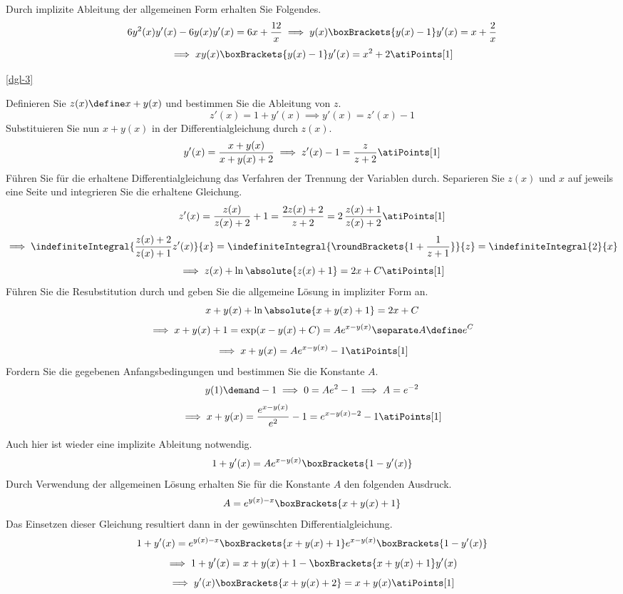 \begin{atiSolution}
\begin{atiSubtaskSolutions}
{			Durch implizite Ableitung der allgemeinen Form erhalten Sie Folgendes.
			\[
				6y^2(x)y'(x) - 6y(x)y'(x) = 6x + \frac{12}{x} \implies y(x)\boxBrackets{y(x)-1}y'(x) = x + \frac{2}{x}
			\]
			\[
				\implies xy(x)\boxBrackets{y(x)-1}y'(x) = x^2+2
				\atiPoints[1]
			\]
		}

		\item[\ref{dgl-3}]{
			Definieren Sie $z(x)\define x + y(x)$ und bestimmen Sie die Ableitung von $z$.
			\[
				z'(x) = 1 + y'(x) \implies y'(x) = z'(x) - 1
			\]
			Substituieren Sie nun $x+y(x)$ in der Differentialgleichung durch $z(x)$.
			\[
				y'(x) = \frac{x+y(x)}{x+y(x)+2} \implies z'(x) - 1 = \frac{z}{z+2}
				\atiPoints[1]
			\]
			Führen Sie für die erhaltene Differentialgleichung das Verfahren der Trennung der Variablen durch.
			Separieren Sie $z(x)$ und $x$ auf jeweils eine Seite und integrieren Sie die erhaltene Gleichung.
			\[
				z'(x) = \frac{z(x)}{z(x)+2} + 1 = \frac{2z(x)+2}{z+2} = 2\,\frac{z(x)+1}{z(x)+2}
				\atiPoints[1]
			\]
			\[
				\implies \indefiniteIntegral{\frac{z(x)+2}{z(x)+1}z'(x)}{x} = \indefiniteIntegral{\roundBrackets{1 + \frac{1}{z+1}}}{z} = \indefiniteIntegral{2}{x}
			\]
			\[
				\implies z(x) + \ln\absolute{z(x)+1} = 2x + C
				\atiPoints[1]
			\]
			Führen Sie die Resubstitution durch und geben Sie die allgemeine Lösung in impliziter Form an.
			\[
				x + y(x) + \ln\absolute{x+ y(x) + 1} = 2x + C
			\]
			\[
				\implies x+y(x)+1 = \exp(x-y(x)+C) = Ae^{x-y(x)} \separate A\define e^C
			\]
			\[
				\implies x+y(x) = Ae^{x-y(x)} -1
				\atiPoints[1]
			\]
			Fordern Sie die gegebenen Anfangsbedingungen und bestimmen Sie die Konstante $A$.
			\[
				y(1)\demand -1 \implies 0=Ae^2-1 \implies A= e^{-2}
			\]
			\[
				\implies x+y(x) = \frac{e^{x-y(x)}}{e^2}-1 = e^{x-y(x)-2}-1
				\atiPoints[1]
			\]

			Auch hier ist wieder eine implizite Ableitung notwendig.
			\[
				1+y'(x) = Ae^{x-y(x)} \boxBrackets{1-y'(x)}
			\]
			Durch Verwendung der allgemeinen Lösung erhalten Sie für die Konstante $A$ den folgenden Ausdruck.
			\[
				A = e^{y(x)-x}\boxBrackets{x+y(x)+1}
			\]
			Das Einsetzen dieser Gleichung resultiert dann in der gewünschten Differentialgleichung.
			\[
				1+y'(x) = e^{y(x)-x}\boxBrackets{x+y(x)+1} e^{x-y(x)} \boxBrackets{1-y'(x)}
			\]
			\[
				\implies 1+y'(x) = x+y(x)+1 - \boxBrackets{x+y(x)+1}y'(x)
			\]
			\[
				\implies y'(x)\boxBrackets{x+y(x)+2} = x+y(x)
				\atiPoints[1]
			\]
		}
	\end{atiSubtaskSolutions}
\end{atiSolution}